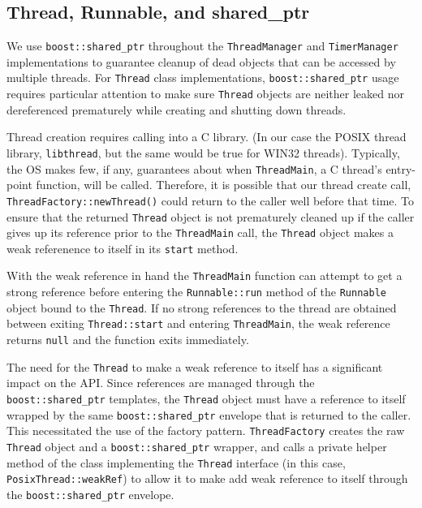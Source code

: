 \documentclass[nocopyrightspace,blockstyle]{sigplanconf}
\begin{document}
\subsection{Thread, Runnable, and shared\_ptr}
We use \texttt{boost::shared\_ptr} throughout the \texttt{ThreadManager} and
\texttt{TimerManager} implementations to guarantee cleanup of dead objects that can
be accessed by multiple threads. For \texttt{Thread} class implementations,
\texttt{boost::shared\_ptr} usage requires particular attention to make sure
\texttt{Thread} objects are neither leaked nor dereferenced prematurely while
creating and shutting down threads.

Thread creation requires calling into a C library. (In our case the POSIX
thread library, \texttt{libthread}, but the same would be true for WIN32 threads).
Typically, the OS makes few, if any, guarantees about when \texttt{ThreadMain}, a C thread's entry-point function, will be called. Therefore, it is
possible that our thread create call,
\texttt{ThreadFactory::newThread()} could return to the caller
well before that time. To ensure that the returned \texttt{Thread} object is not
prematurely cleaned up if the caller gives up its reference prior to the
\texttt{ThreadMain} call, the \texttt{Thread} object makes a weak referenence to
itself in its \texttt{start} method.

With the weak reference in hand the \texttt{ThreadMain} function can attempt to get
a strong reference before entering the \texttt{Runnable::run} method of the
\texttt{Runnable} object bound to the \texttt{Thread}. If no strong references to the
thread are obtained between exiting \texttt{Thread::start} and entering \texttt{ThreadMain}, the weak reference returns \texttt{null} and the function 
exits immediately.

The need for the \texttt{Thread} to make a weak reference to itself has a
significant impact on the API. Since references are managed through the
\texttt{boost::shared\_ptr} templates, the \texttt{Thread} object must have a reference
to itself wrapped by the same \texttt{boost::shared\_ptr} envelope that is returned
to the caller. This necessitated the use of the factory pattern.
\texttt{ThreadFactory} creates the raw \texttt{Thread} object and a
\texttt{boost::shared\_ptr} wrapper, and calls a private helper method of the class
implementing the \texttt{Thread} interface (in this case, \texttt{PosixThread::weakRef})
 to allow it to make add weak reference to itself through the
 \texttt{boost::shared\_ptr} envelope.
\end{document}
